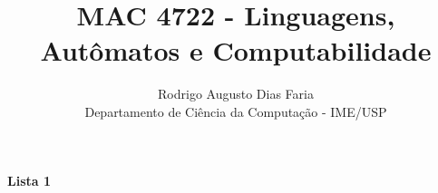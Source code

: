 \documentclass[12pt]{article}
\theoremstyle{plain}
\begin{document}
\title{MAC 4722 - Linguagens, Autômatos e Computabilidade}
\author{Rodrigo Augusto Dias Faria\\
Departamento de Ciência da Computação - IME/USP}

\maketitle

\begin{center}
\textbf{\large{Lista 1}}
\end{center}



\end{document}
